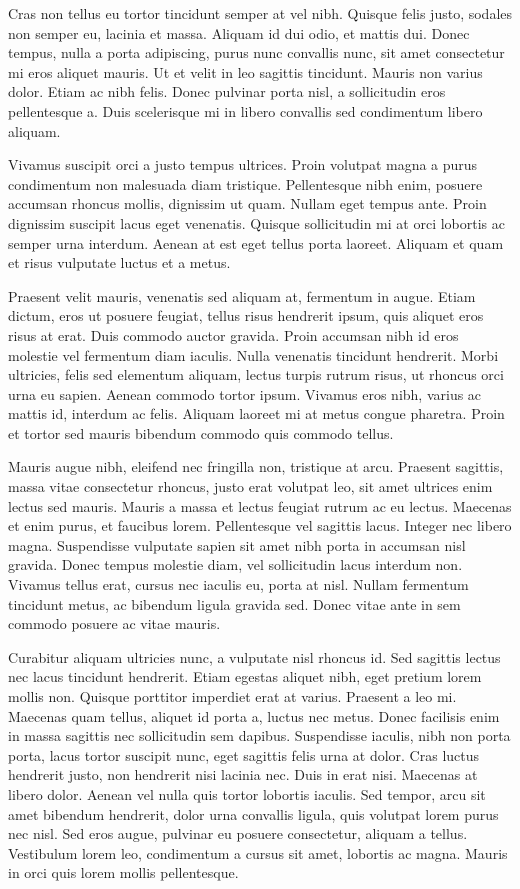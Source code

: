 Cras non tellus eu tortor tincidunt semper at vel nibh. Quisque felis
justo, sodales non semper eu, lacinia et massa. Aliquam id dui odio,
et mattis dui. Donec tempus, nulla a porta adipiscing, purus nunc
convallis nunc, sit amet consectetur mi eros aliquet mauris. Ut et
velit in leo sagittis tincidunt. Mauris non varius dolor. Etiam ac
nibh felis. Donec pulvinar porta nisl, a sollicitudin eros pellentesque
a. Duis scelerisque mi in libero convallis sed condimentum libero
aliquam.

Vivamus suscipit orci a justo tempus ultrices. Proin volutpat magna
a purus condimentum non malesuada diam tristique. Pellentesque nibh
enim, posuere accumsan rhoncus mollis, dignissim ut quam. Nullam eget
tempus ante. Proin dignissim suscipit lacus eget venenatis. Quisque
sollicitudin mi at orci lobortis ac semper urna interdum. Aenean at
est eget tellus porta laoreet. Aliquam et quam et risus vulputate
luctus et a metus.

Praesent velit mauris, venenatis sed aliquam at, fermentum in augue.
Etiam dictum, eros ut posuere feugiat, tellus risus hendrerit ipsum,
quis aliquet eros risus at erat. Duis commodo auctor gravida. Proin
accumsan nibh id eros molestie vel fermentum diam iaculis. Nulla venenatis
tincidunt hendrerit. Morbi ultricies, felis sed elementum aliquam,
lectus turpis rutrum risus, ut rhoncus orci urna eu sapien. Aenean
commodo tortor ipsum. Vivamus eros nibh, varius ac mattis id, interdum
ac felis. Aliquam laoreet mi at metus congue pharetra. Proin et tortor
sed mauris bibendum commodo quis commodo tellus.

Mauris augue nibh, eleifend nec fringilla non, tristique at arcu.
Praesent sagittis, massa vitae consectetur rhoncus, justo erat volutpat
leo, sit amet ultrices enim lectus sed mauris. Mauris a massa et lectus
feugiat rutrum ac eu lectus. Maecenas et enim purus, et faucibus lorem.
Pellentesque vel sagittis lacus. Integer nec libero magna. Suspendisse
vulputate sapien sit amet nibh porta in accumsan nisl gravida. Donec
tempus molestie diam, vel sollicitudin lacus interdum non. Vivamus
tellus erat, cursus nec iaculis eu, porta at nisl. Nullam fermentum
tincidunt metus, ac bibendum ligula gravida sed. Donec vitae ante
in sem commodo posuere ac vitae mauris.

Curabitur aliquam ultricies nunc, a vulputate nisl rhoncus id. Sed
sagittis lectus nec lacus tincidunt hendrerit. Etiam egestas aliquet
nibh, eget pretium lorem mollis non. Quisque porttitor imperdiet erat
at varius. Praesent a leo mi. Maecenas quam tellus, aliquet id porta
a, luctus nec metus. Donec facilisis enim in massa sagittis nec sollicitudin
sem dapibus. Suspendisse iaculis, nibh non porta porta, lacus tortor
suscipit nunc, eget sagittis felis urna at dolor. Cras luctus hendrerit
justo, non hendrerit nisi lacinia nec. Duis in erat nisi. Maecenas
at libero dolor. Aenean vel nulla quis tortor lobortis iaculis. Sed
tempor, arcu sit amet bibendum hendrerit, dolor urna convallis ligula,
quis volutpat lorem purus nec nisl. Sed eros augue, pulvinar eu posuere
consectetur, aliquam a tellus. Vestibulum lorem leo, condimentum a
cursus sit amet, lobortis ac magna. Mauris in orci quis lorem mollis
pellentesque.

